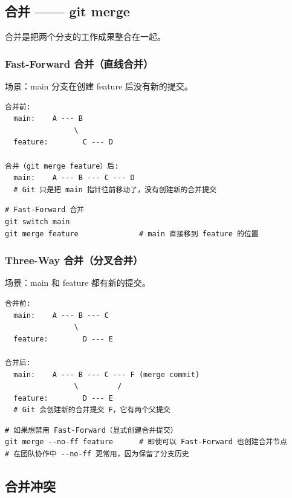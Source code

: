 \documentclass[12pt,a4paper]{article}
\begin{document}
\subsection{合并 —— git merge}

合并是把两个分支的工作成果整合在一起。

\subsubsection{Fast-Forward 合并（直线合并）}

场景：main 分支在创建 feature 后没有新的提交。

\begin{lstlisting}[numbers=none]
合并前:
  main:    A --- B
                \
  feature:        C --- D

合并（git merge feature）后:
  main:    A --- B --- C --- D
  # Git 只是把 main 指针往前移动了，没有创建新的合并提交
\end{lstlisting}

\begin{lstlisting}
# Fast-Forward 合并
git switch main
git merge feature              # main 直接移到 feature 的位置
\end{lstlisting}

\subsubsection{Three-Way 合并（分叉合并）}

场景：main 和 feature 都有新的提交。

\begin{lstlisting}[numbers=none]
合并前:
  main:    A --- B --- C
                \
  feature:        D --- E

合并后:
  main:    A --- B --- C --- F (merge commit)
                \         /
  feature:        D --- E
  # Git 会创建新的合并提交 F，它有两个父提交
\end{lstlisting}

\begin{lstlisting}
# 如果想禁用 Fast-Forward（显式创建合并提交）
git merge --no-ff feature      # 即使可以 Fast-Forward 也创建合并节点
# 在团队协作中 --no-ff 更常用，因为保留了分支历史
\end{lstlisting}

\subsection{合并冲突}
\end{document}
